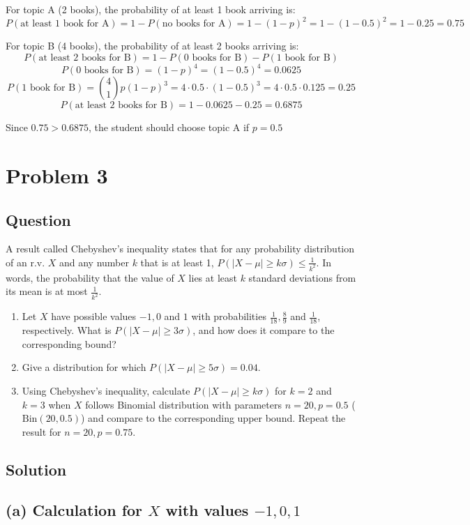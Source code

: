 \documentclass{article}
\begin{document}
For topic A (2 books), the probability of at least 1 book arriving is:
\[
P(\text{at least 1 book for A}) = 1 - P(\text{no books for A}) = 1 - (1-p)^2 = 1 - (1-0.5)^2 = 1 - 0.25 = 0.75
\]

For topic B (4 books), the probability of at least 2 books arriving is:
\[
P(\text{at least 2 books for B}) = 1 - P(\text{0 books for B}) - P(\text{1 book for B})
\]
\[
P(\text{0 books for B}) = (1-p)^4 = (1-0.5)^4 = 0.0625
\]
\[
P(\text{1 book for B}) = \binom{4}{1} p (1-p)^3 = 4 \cdot 0.5 \cdot (1-0.5)^3 = 4 \cdot 0.5 \cdot 0.125 = 0.25
\]
\[
P(\text{at least 2 books for B}) = 1 - 0.0625 - 0.25 = 0.6875
\]

Since \(0.75 > 0.6875\), the student should choose topic A if \(p = 0.5\)
\section*{Problem 3}
\subsection*{Question}
A result called Chebyshev's inequality states that for any probability distribution of an r.v. \(X\) and any number \(k\) that is at least 1, \(P(|X - \mu| \geq k\sigma) \leq \frac{1}{k^2}\). In words, the probability that the value of \(X\) lies at least \(k\) standard deviations from its mean is at most \(\frac{1}{k^2}\).

\begin{enumerate}
    \item Let \(X\) have possible values \(-1, 0\) and \(1\) with probabilities \(\frac{1}{18}, \frac{8}{9}\) and \(\frac{1}{18}\), respectively. What is \(P(|X - \mu| \geq 3\sigma)\), and how does it compare to the corresponding bound?
    \item Give a distribution for which \(P(|X - \mu| \geq 5\sigma) = 0.04\).
    \item Using Chebyshev's inequality, calculate \(P(|X - \mu| \geq k\sigma)\) for \(k = 2\) and \(k = 3\) when \(X\) follows Binomial distribution with parameters \(n = 20, p = 0.5\) (\(\text{Bin}(20,0.5)\)) and compare to the corresponding upper bound. Repeat the result for \(n = 20, p = 0.75\).
\end{enumerate}
\subsection*{Solution}
\subsection*{(a) Calculation for \(X\) with values \(-1, 0, 1\)}
\end{document}
